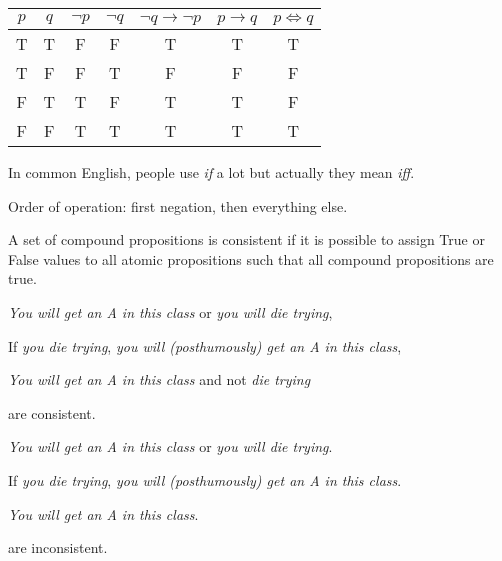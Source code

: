 \begin{tabular}{ccccccc}
$p$ & $q$ & $\lnot p$ & $\lnot q$ & $\lnot q \rightarrow \lnot p$ & $p \rightarrow q$ & $p \Leftrightarrow q$\\\hline
  T &   T &         F &           F &          T &           T & T \\
  T &   F &         F &           T &          F &           F & F \\
  F &   T &         T &           F &          T &           T & F\\
  F &   F &         T &           T &          T &           T & T
\end{tabular}

\begin{remark}

In common English, people use \textit{if} a lot but actually they mean \textit{iff}.

\end{remark}

Order of operation: first negation, then everything else.

\begin{defn}

A set of compound propositions is consistent if it is possible to assign True or False values to all atomic propositions such that all compound propositions are true.

\end{defn}

\begin{ex}

\textit{You will get an A in this class} or \textit{you will die trying},

If \textit{you die trying}, \textit{you will (posthumously) get an A in this class},

\textit{You will get an A in this class} and not \textit{die trying}

are consistent.

\end{ex}

\begin{ex}

\textit{You will get an A in this class} or \textit{you will die trying}.

If \textit{you die trying}, \textit{you will (posthumously) get an A in this class}.

\textit{You will get an A in this class}.

are inconsistent.

\end{ex}

